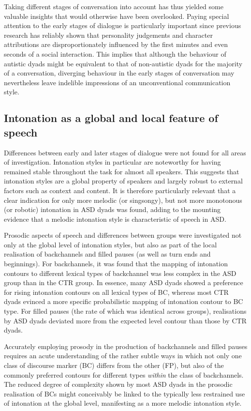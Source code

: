 Taking different stages of conversation into account has thus yielded some valuable insights that would otherwise have been overlooked. Paying special attention to the early stages of dialogue is particularly important since previous research has reliably shown that personality judgements and character attributions are disproportionately influenced by the first minutes and even seconds of a social interaction. This implies that although the behaviour of autistic dyads might be equivalent to that of non-autistic dyads for the majority of a conversation, diverging behaviour in the early stages of conversation may nevertheless leave indelible impressions of an unconventional communication style.

\subsection{Intonation as a global and local feature of speech}\label{Conclusion_discussion_intonation}

Differences between early and later stages of dialogue were not found for all areas of investigation. Intonation styles in particular are noteworthy for having remained stable throughout the task for almost all speakers. This suggests that intonation styles are a global property of speakers and largely robust to external factors such as context and content. It is therefore particularly relevant that a clear indication for only more melodic (or singsongy), but not more monotonous (or robotic) intonation in ASD dyads was found, adding to the mounting evidence that a melodic intonation style is characteristic of speech in ASD.

Prosodic aspects of speech and differences between groups were investigated not only at the global level of intonation styles, but also as part of the local realisation of backchannels and filled pauses (as well as turn ends and beginnings). For backchannels, it was found that the mapping of intonation contours to different lexical types of backchannel was less complex in the ASD group than in the CTR group. In essence, many ASD dyads showed a preference for rising intonation contours on all lexical types of BC, whereas most CTR dyads evinced a more specific probabilistic mapping of intonation contour to BC type. For filled pauses (the rate of which was identical across groups), realisations by ASD dyads deviated more from the expected level contour than those by CTR dyads.

Accurately employing prosody in the production of backchannels and filled pauses requires an acute understanding of the rather subtle ways in which not only one class of discourse marker (BC) differs from the other (FP), but also of the commonly preferred contours for different types \emph{within} the class of backchannels. The reduced degree of complexity shown by most ASD dyads in the prosodic realisation of BCs might conceivably be linked to the typically less restrained use of intonation at the global level, manifesting as a more melodic intonation style.

